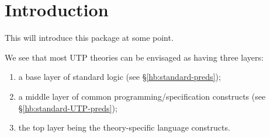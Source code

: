 \section{Introduction}\label{sec:intro}

This will introduce this package at some point.

We see that most UTP theories can be envisaged as having three
layers:
\begin{enumerate}
  \item a base layer of standard logic (see \S\ref{hb:standard-preds});
  \item a middle layer of common programming/specification constructs
     (see \S\ref{hb:standard-UTP-preds});
  \item the top layer being the theory-specific language constructs.
\end{enumerate}

